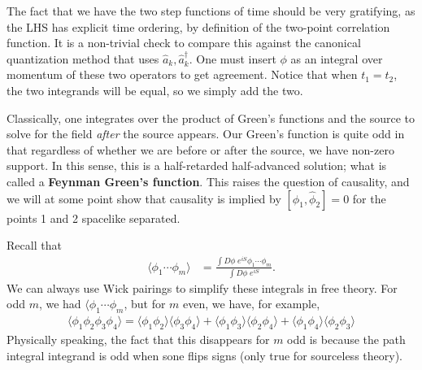 \documentclass{../mathnotes}
\begin{document}
The fact that we have the two step functions of time should be very gratifying, as the LHS has explicit time ordering, by definition of the two-point
correlation function. It is a non-trivial check to compare this against the canonical quantization method that uses $\hat{a}_k,\hat{a}_k^\dagger$.
One must insert $\phi$ as an integral over momentum of these two operators to get agreement. Notice that when $t_1=t_2$, the two integrands will
be equal, so we simply add the two.

Classically, one integrates over the product of Green's functions and the source to solve for the field \textit{after} the source appears.
Our Green's function is quite odd in that regardless of whether we are before or after the source, we have non-zero support. In this sense,
this is a half-retarded half-advanced solution; what is called a \textbf{Feynman Green's function}. This raises the question of causality, and we
will at some point show that causality is implied by $[\hat{\phi}_1,\hat{\phi}_2]=0$ for the points 1 and 2 spacelike separated.

Recall that 
\begin{align*}
    \langle \phi_1 \cdots \phi_m\rangle&=\frac{\int D\phi\;e^{iS}\phi_1\cdots\phi_m}{\int D\phi\;e^{iS}}.
\end{align*}
We can always use Wick pairings to simplify these integrals in free theory. For odd $m$, we had $\langle \phi_1\cdots\phi_m$, but for $m$ even,
we have, for example,
\begin{align*}
    \langle \phi_1\phi_2\phi_3\phi_4 \rangle=\langle\phi_1\phi_2\rangle\langle\phi_3\phi_4\rangle+\langle\phi_1\phi_3\rangle\langle\phi_2\phi_4\rangle+\langle\phi_1\phi_4\rangle\langle\phi_2\phi_3\rangle
\end{align*}
Physically speaking, the fact that this disappears for $m$ odd is because the path integral integrand is odd when sone flips signs (only true for
sourceless theory).
\end{document}

